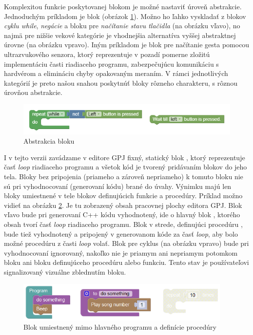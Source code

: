 Komplexitou funkcie poskytovanej blokom je možné nastaviť úroveň abstrakcie. Jednoduchým príkladom je blok  (obrázok \ref{obr:wait-till-couch}). Možno ho ľahko vyskladať z blokov \textit{cyklu while}, \textit{negácie} a bloku pre \textit{načítanie stavu tlačidla} (na obrázku vľavo), no najmä pre nižšie vekové kategórie je vhodnejšia alternatíva vyššej abstraktnej úrovne (na obrázku vpravo). Iným príkladom je blok pre načítanie gesta pomocou ultrazvukového senzora, ktorý reprezentuje v pozadí pomerne zložitú implementáciu časti riadiaceho programu, zabezpečujúcu komunikáciu s hardvérom a elimináciu chyby opakovaným meraním. V rámci jednotlivých kategórií je preto našou snahou poskytnúť bloky rôzneho charakteru, s rôznou úrovňou abstrakcie.

\begin{figure}
\centerline{\includegraphics[width=1\textwidth]{images/wait-till-couch}}
\caption[Abstrakcia bloku ]{Abstrakcia bloku }
\label{obr:wait-till-couch}
\end{figure}

I v tejto verzii zavádzame v editore GPJ fixný, statický blok , ktorý reprezentuje časť \textit{loop} riadiaceho programu a všetok kód je tvorený pridávaním blokov do jeho tela. Bloky bez pripojenia (priameho a zároveň nepriameho) k tomuto bloku nie sú pri vyhodnocovaní (generovaní kódu) brané do úvahy. Výnimku majú len bloky umiestnené v tele blokov definujúcich funkcie a procedúry. Príklad možno vidieť na obrázku \ref{obr:disabled-orphan-block}. Je tu zobrazený obsah pracovnej plochy editora GPJ. Blok vľavo bude pri generovaní C++ kódu vyhodnotený, ide o hlavný blok , ktorého obsah tvorí časť \textit{loop} riadiaceho programu. Blok v strede, definujúci procedúru , bude tiež vyhodnotený a pripojený v generovanom kóde za časť \textit{loop}, aby bolo možné procedúru z časti \textit{loop} volať. Blok pre cyklus (na obrázku vpravo) bude pri vyhodnocovaní ignorovaný, nakoľko nie je priamym ani nepriamym potomkom bloku  ani bloku definujúceho procedúru alebo funkciu. Tento stav je používateľovi signalizovaný vizuálne zblednutím bloku.

\begin{figure}
\centerline{\includegraphics[width=0.95\textwidth]{images/disabled-orphan-block}}
\caption[Blok umiestnený mimo hlavného programu a definície procedúry]{Blok umiestnený mimo hlavného programu a definície procedúry}
\label{obr:disabled-orphan-block}
\end{figure}

